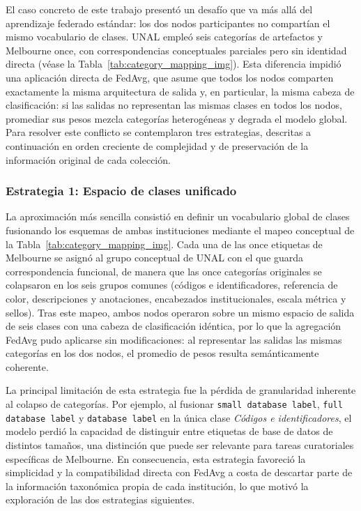 El caso concreto de este trabajo presentó un desafío que va más allá del aprendizaje
federado estándar: los dos nodos participantes no compartían el mismo vocabulario de clases.
UNAL empleó seis categorías de artefactos y Melbourne once, con correspondencias
conceptuales parciales pero sin identidad directa (véase la Tabla~\ref{tab:category_mapping_img}).
Esta diferencia impidió una aplicación directa de FedAvg, que asume que todos los nodos
comparten exactamente la misma arquitectura de salida y, en particular, la misma cabeza de
clasificación: si las salidas no representan las mismas clases en todos los nodos, promediar
sus pesos mezcla categorías heterogéneas y degrada el modelo global. Para resolver este
conflicto se contemplaron tres estrategias, descritas a continuación en orden creciente de
complejidad y de preservación de la información original de cada colección.
 
\subsubsection{Estrategia 1: Espacio de clases unificado}
 
La aproximación más sencilla consistió en definir un vocabulario global de clases fusionando
los esquemas de ambas instituciones mediante el mapeo conceptual de la
Tabla~\ref{tab:category_mapping_img}. Cada una de las once etiquetas de Melbourne se asignó
al grupo conceptual de UNAL con el que guarda correspondencia funcional, de manera que las
once categorías originales se colapsaron en los seis grupos comunes (códigos e
identificadores, referencia de color, descripciones y anotaciones, encabezados
institucionales, escala métrica y sellos). Tras este mapeo, ambos nodos operaron sobre un
mismo espacio de salida de seis clases con una cabeza de clasificación idéntica, por lo que
la agregación FedAvg pudo aplicarse sin modificaciones: al representar las salidas las mismas
categorías en los dos nodos, el promedio de pesos resulta semánticamente coherente.

La principal limitación de esta estrategia fue la pérdida de granularidad inherente al
colapso de categorías. Por ejemplo, al fusionar \texttt{small database label},
\texttt{full database label} y \texttt{database label} en la única clase \textit{Códigos e
identificadores}, el modelo perdió la capacidad de distinguir entre etiquetas de base de
datos de distintos tamaños, una distinción que puede ser relevante para tareas curatoriales
específicas de Melbourne. En consecuencia, esta estrategia favoreció la simplicidad y la
compatibilidad directa con FedAvg a costa de descartar parte de la información taxonómica
propia de cada institución, lo que motivó la exploración de las dos estrategias siguientes.
 
